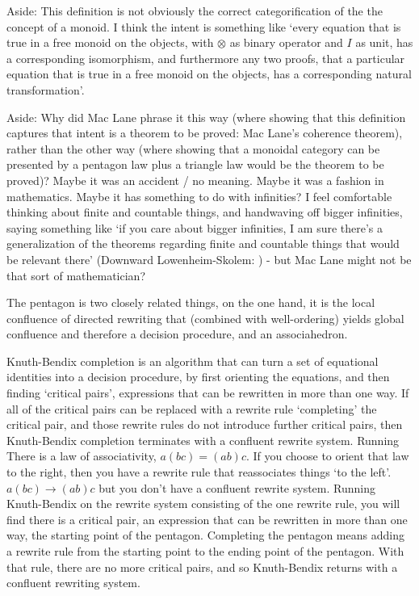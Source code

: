 \documentclass[a4paper]{article}
\begin{document}
Aside: This definition is not obviously the correct categorification of the the concept of a monoid. I think the intent is something like `every equation that is true in a free monoid on the objects, with \(\otimes\) as binary operator and \(I\) as unit, has a corresponding isomorphism, and furthermore any two proofs, that a particular equation that is true in a free monoid on the objects, has a corresponding natural transformation'. 

Aside: Why did Mac Lane phrase it this way (where showing that this definition captures that intent is a theorem to be proved: Mac Lane's coherence theorem), rather than the other way (where showing that a monoidal category can be presented by a pentagon law plus a triangle law would be the theorem to be proved)? Maybe it was an accident / no meaning. Maybe it was a fashion in mathematics. Maybe it has something to do with infinities? I feel comfortable thinking about finite and countable things, and handwaving off bigger infinities, saying something like `if you care about bigger infinities, I am sure there's a generalization of the theorems regarding finite and countable things that would be relevant there' (Downward Lowenheim-Skolem: \cite{lowenheim1915moglichkeiten, skolem1919untersuchungen, skolem1922einige, burris2001downward}) - but Mac Lane might not be that sort of mathematician? 

The pentagon is two closely related things, on the one hand, it is the local confluence of directed rewriting that (combined with well-ordering) yields global confluence and therefore a decision procedure, and an associahedron.

Knuth-Bendix completion is an algorithm that can turn a set of equational identities into a decision procedure, by first orienting the equations, and then finding `critical pairs', expressions that can be rewritten in more than one way. If all of the critical pairs can be replaced with a rewrite rule `completing' the critical pair, and those rewrite rules do not introduce further critical pairs, then Knuth-Bendix completion terminates with a confluent rewrite system. Running  There is a law of associativity, \( a ( b c ) = (a b) c \). If you choose to orient that law to the right, then you have a rewrite rule that reassociates things `to the left'. \( a ( b c ) \to (a b) c\) but you don't have a confluent rewrite system. Running Knuth-Bendix on the rewrite system consisting of the one rewrite rule, you will find there is a critical pair, an expression that can be rewritten in more than one way, the starting point of the pentagon. Completing the pentagon means adding a rewrite rule from the starting point to the ending point of the pentagon. With that rule, there are no more critical pairs, and so Knuth-Bendix returns with a confluent rewriting system. 
\end{document}
